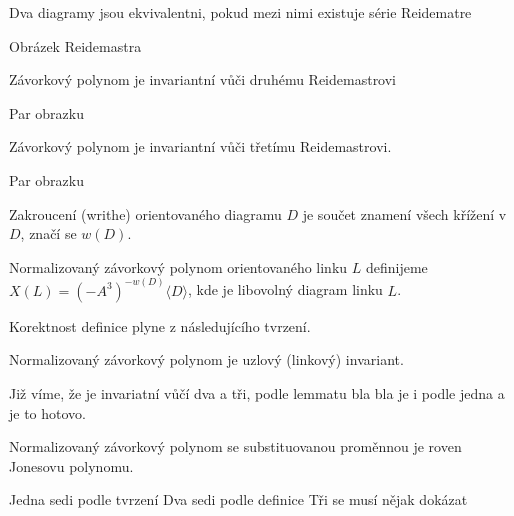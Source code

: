 Dva diagramy jsou ekvivalentni, pokud mezi nimi existuje série Reidematre

Obrázek Reidemastra

\begin{tvrz}
Závorkový polynom je invariantní vůči druhému Reidemastrovi
\end{tvrz}
\begin{dukaz}
Par obrazku
\end{dukaz}

\begin{dusl}
Závorkový polynom je invariantní vůči třetímu Reidemastrovi.
\end{dusl}
\begin{dukaz}
Par obrazku
\end{dukaz}

\begin{definice}
Zakroucení (writhe) orientovaného diagramu $D$ je součet znamení všech křížení v $D$, značí se $w(D)$.
\end{definice}

\begin{definice}
Normalizovaný závorkový polynom orientovaného linku $L$ definijeme $X(L) = (-A^3)^{-w(D)}\langle D \rangle$, kde je libovolný diagram linku $L$.
\end{definice}

Korektnost definice plyne z následujícího tvrzení.

\begin{tvrz}
Normalizovaný závorkový polynom je uzlový (linkový) invariant.
\end{tvrz}
\begin{dukaz}
Již víme, že je invariatní vůčí dva a tři, podle lemmatu bla bla je i podle jedna a je to hotovo.
\end{dukaz}

\begin{veta}
Normalizovaný závorkový polynom se substituovanou proměnnou je roven Jonesovu polynomu.
\end{veta}
\begin{dukaz}
Jedna sedi podle tvrzení
Dva sedi podle definice
Tři se musí nějak dokázat
\end{dukaz}




